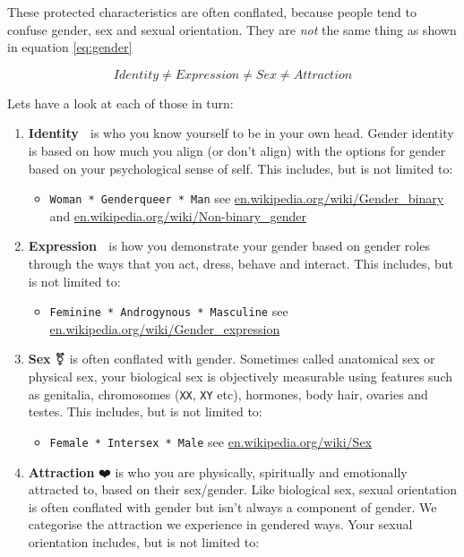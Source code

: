 \documentclass[
]{book}
\providecommand{\tightlist}{%
  \setlength{\itemsep}{0pt}\setlength{\parskip}{0pt}}
\begin{document}
These protected characteristics are often conflated, because people tend to confuse gender, sex and sexual orientation. They are \emph{not} the same thing as shown in equation \eqref{eq:gender}

\begin{equation}
Identity ≠ Expression ≠ Sex ≠ Attraction
  \label{eq:gender}
\end{equation}

Lets have a look at each of those in turn:

\begin{enumerate}
\def\labelenumi{\arabic{enumi}.}
\tightlist
\item
  \textbf{Identity} 🧠 is who you know yourself to be in your own head. Gender identity is based on how much you align (or don't align) with the options for gender based on your psychological sense of self. This includes, but is not limited to:

  \begin{itemize}
  \tightlist
  \item
    \texttt{Woman\ *\ Genderqueer\ *\ Man} see \href{https://en.wikipedia.org/wiki/Gender_binary}{en.wikipedia.org/wiki/Gender\_binary} and \href{https://en.wikipedia.org/wiki/Non-binary_gender}{en.wikipedia.org/wiki/Non-binary\_gender}
  \end{itemize}
\item
  \textbf{Expression} 🎨 is how you demonstrate your gender based on gender roles through the ways that you act, dress, behave and interact. This includes, but is not limited to:

  \begin{itemize}
  \tightlist
  \item
    \texttt{Feminine\ *\ Androgynous\ *\ Masculine} see \href{https://en.wikipedia.org/wiki/Gender_expression}{en.wikipedia.org/wiki/Gender\_expression}
  \end{itemize}
\item
  \textbf{Sex} ⚧️ is often conflated with gender. Sometimes called anatomical sex or physical sex, your biological sex is objectively measurable using features such as genitalia, chromosomes (\texttt{XX}, \texttt{XY} etc), hormones, body hair, ovaries and testes. This includes, but is not limited to:

  \begin{itemize}
  \tightlist
  \item
    \texttt{Female\ *\ Intersex\ *\ Male} see \href{https://en.wikipedia.org/wiki/Sex}{en.wikipedia.org/wiki/Sex}
  \end{itemize}
\item
  \textbf{Attraction} ❤️ is who you are physically, spiritually and emotionally attracted to, based on their sex/gender. Like biological sex, sexual orientation is often conflated with gender but isn't always a component of gender. We categorise the attraction we experience in gendered ways. Your sexual orientation includes, but is not limited to:


\end{enumerate}
\end{document}
